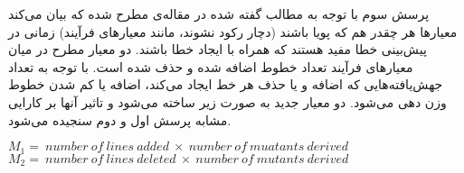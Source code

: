 پرسش سوم با توجه به مطالب گفته شده در مقاله‌ی \cite{rahman2013and} مطرح شده که بیان می‌کند معیارها هر چقدر هم که پویا باشند (دچار رکود نشوند، مانند معیارهای فرآیند) زمانی در پیش‌بینی خطا مفید هستند که همراه با ایجاد خطا باشند.  دو معیار مطرح در میان معیارهای فرآیند تعداد خطوط اضافه شده و حذف شده است. با توجه به تعداد جهش‌یافته‌هایی که  اضافه  و یا حذف هر خط ایجاد می‌کند، اضافه یا کم شدن خطوط وزن دهی می‌شود. دو معیار جدید به صورت زیر ساخته می‌شود و تاثیر آنها بر کارایی مشابه پرسش اول و دوم سنجیده می‌شود. \\
\begin{latin}
	
	$M_1 =\ number\ of\ lines\ added\ \times \ number\ of\ muatants\ derived$\\
	
	$M_2 =\ number\ of\ lines\ deleted\ \times \ number\ of\ mutants\ derived$\\
\end{latin}



 
